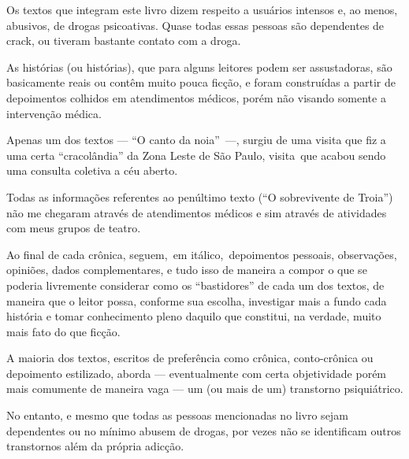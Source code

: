  

Os textos que integram este livro dizem respeito a usuários intensos e,
ao menos, abusivos, de drogas psicoativas. Quase todas essas pessoas são
dependentes de crack, ou tiveram bastante contato com a droga.

As histórias (ou histórias), que para alguns leitores podem ser
assustadoras, são basicamente reais ou contêm muito pouca ficção, e
foram construídas a partir de depoimentos colhidos em atendimentos
médicos, porém não visando somente a intervenção médica.

Apenas um dos textos --- ``O canto da noia''~\mbox{---,} surgiu de uma visita
que fiz a uma certa ``cracolândia'' da Zona Leste de São Paulo,
visita~que acabou sendo uma consulta coletiva a céu aberto.

Todas as informações referentes ao penúltimo texto (``O sobrevivente de
Troia'') não me chegaram através de atendimentos médicos e sim através
de atividades com meus grupos de teatro.

Ao final de cada crônica, seguem,~em itálico,~depoimentos pessoais,
observações, opiniões, dados complementares, e tudo isso de maneira a
compor o que se poderia livremente considerar como os ``bastidores'' de
cada um dos textos, de maneira que o leitor possa, conforme sua escolha,
investigar mais a fundo cada história e tomar conhecimento pleno daquilo
que constitui, na verdade, muito mais fato do que ficção.

A maioria dos textos, escritos de preferência como crônica,
conto-crônica ou depoimento estilizado, aborda --- eventualmente com
certa objetividade porém mais comumente de maneira vaga --- um (ou mais
de um) transtorno psiquiátrico.

No entanto, e mesmo que todas as pessoas mencionadas no livro sejam
dependentes ou no mínimo abusem de drogas, por vezes não se identificam
outros transtornos além da própria adicção.

 

